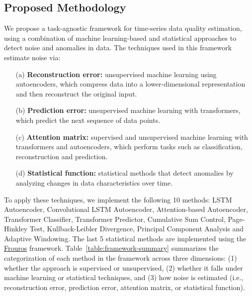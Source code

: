 \subsection{Proposed Methodology}

We propose a task-agnostic framework for time-series data quality estimation, using a combination of machine learning-based and statistical approaches to detect noise and anomalies in data. The techniques used in this framework estimate noise via:

\begin{enumerate}
    \item[(a)] \textbf{Reconstruction error:} unsupervised machine learning using autoencoders, which compress data into a lower-dimensional representation and then reconstruct the original input.
    \vspace{-0.4cm}
    \item[(b)] \textbf{Prediction error:} unsupervised machine learning with transformers, which predict the next sequence of data points.
    \vspace{-0.4cm}
    \item[(c)] \textbf{Attention matrix:} supervised and unsupervised machine learning with transformers and autoencoders, which perform tasks such as classification, reconstruction and prediction.
    \vspace{-0.4cm}
    \item[(d)] \textbf{Statistical function:} statistical methods that detect anomalies by analyzing changes in data characteristics over time.
\end{enumerate}

To apply these techniques, we implement the following 10 methods: LSTM Autoencoder, Convolutional LSTM Autoencoder, Attention-based Autoencoder, Transformer Classifier, Transformer Predictor, Cumulative Sum Control, Page-Hinkley Test, Kullback-Leibler Divergence, Principal Component Analysis and Adaptive Windowing. The last 5 statistical methods are implemented using the \href{https://github.com/IFCA-Advanced-Computing/frouros}{Frouros} framework. Table~\ref{table:framework-summary} summarizes the categorization of each method in the framework across three dimensions: (1) whether the approach is supervised or unsupervised, (2) whether it falls under machine learning or statistical techniques, and (3) how noise is estimated (i.e., reconstruction error, prediction error, attention matrix, or statistical function).

